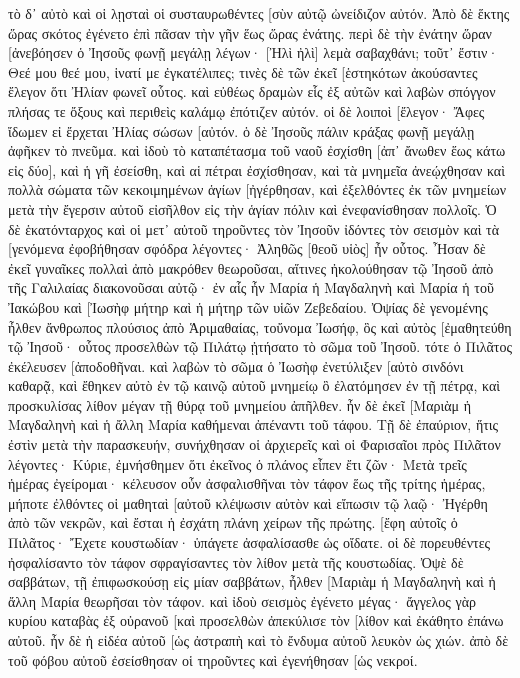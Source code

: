 τὸ δ᾽ αὐτὸ καὶ οἱ λῃσταὶ οἱ συσταυρωθέντες [σὺν αὐτῷ ὠνείδιζον αὐτόν. 
Ἀπὸ δὲ ἕκτης ὥρας σκότος ἐγένετο ἐπὶ πᾶσαν τὴν γῆν ἕως ὥρας ἐνάτης. 
περὶ δὲ τὴν ἐνάτην ὥραν [ἀνεβόησεν ὁ Ἰησοῦς φωνῇ μεγάλῃ λέγων· [Ἠλὶ ἠλὶ] λεμὰ σαβαχθάνι; τοῦτ᾽ ἔστιν· Θεέ μου θεέ μου, ἱνατί με ἐγκατέλιπες; 
τινὲς δὲ τῶν ἐκεῖ [ἑστηκότων ἀκούσαντες ἔλεγον ὅτι Ἠλίαν φωνεῖ οὗτος. 
καὶ εὐθέως δραμὼν εἷς ἐξ αὐτῶν καὶ λαβὼν σπόγγον πλήσας τε ὄξους καὶ περιθεὶς καλάμῳ ἐπότιζεν αὐτόν. 
οἱ δὲ λοιποὶ [ἔλεγον· Ἄφες ἴδωμεν εἰ ἔρχεται Ἠλίας σώσων [αὐτόν. 
ὁ δὲ Ἰησοῦς πάλιν κράξας φωνῇ μεγάλῃ ἀφῆκεν τὸ πνεῦμα. 
καὶ ἰδοὺ τὸ καταπέτασμα τοῦ ναοῦ ἐσχίσθη [ἀπ᾽ ἄνωθεν ἕως κάτω εἰς δύο], καὶ ἡ γῆ ἐσείσθη, καὶ αἱ πέτραι ἐσχίσθησαν, 
καὶ τὰ μνημεῖα ἀνεῴχθησαν καὶ πολλὰ σώματα τῶν κεκοιμημένων ἁγίων [ἠγέρθησαν, 
καὶ ἐξελθόντες ἐκ τῶν μνημείων μετὰ τὴν ἔγερσιν αὐτοῦ εἰσῆλθον εἰς τὴν ἁγίαν πόλιν καὶ ἐνεφανίσθησαν πολλοῖς. 
Ὁ δὲ ἑκατόνταρχος καὶ οἱ μετ᾽ αὐτοῦ τηροῦντες τὸν Ἰησοῦν ἰδόντες τὸν σεισμὸν καὶ τὰ [γενόμενα ἐφοβήθησαν σφόδρα λέγοντες· Ἀληθῶς [θεοῦ υἱὸς] ἦν οὗτος. 
Ἦσαν δὲ ἐκεῖ γυναῖκες πολλαὶ ἀπὸ μακρόθεν θεωροῦσαι, αἵτινες ἠκολούθησαν τῷ Ἰησοῦ ἀπὸ τῆς Γαλιλαίας διακονοῦσαι αὐτῷ· 
ἐν αἷς ἦν Μαρία ἡ Μαγδαληνὴ καὶ Μαρία ἡ τοῦ Ἰακώβου καὶ [Ἰωσὴφ μήτηρ καὶ ἡ μήτηρ τῶν υἱῶν Ζεβεδαίου. 
Ὀψίας δὲ γενομένης ἦλθεν ἄνθρωπος πλούσιος ἀπὸ Ἁριμαθαίας, τοὔνομα Ἰωσήφ, ὃς καὶ αὐτὸς [ἐμαθητεύθη τῷ Ἰησοῦ· 
οὗτος προσελθὼν τῷ Πιλάτῳ ᾐτήσατο τὸ σῶμα τοῦ Ἰησοῦ. τότε ὁ Πιλᾶτος ἐκέλευσεν [ἀποδοθῆναι. 
καὶ λαβὼν τὸ σῶμα ὁ Ἰωσὴφ ἐνετύλιξεν [αὐτὸ σινδόνι καθαρᾷ, 
καὶ ἔθηκεν αὐτὸ ἐν τῷ καινῷ αὐτοῦ μνημείῳ ὃ ἐλατόμησεν ἐν τῇ πέτρᾳ, καὶ προσκυλίσας λίθον μέγαν τῇ θύρᾳ τοῦ μνημείου ἀπῆλθεν. 
ἦν δὲ ἐκεῖ [Μαριὰμ ἡ Μαγδαληνὴ καὶ ἡ ἄλλη Μαρία καθήμεναι ἀπέναντι τοῦ τάφου. 
Τῇ δὲ ἐπαύριον, ἥτις ἐστὶν μετὰ τὴν παρασκευήν, συνήχθησαν οἱ ἀρχιερεῖς καὶ οἱ Φαρισαῖοι πρὸς Πιλᾶτον 
λέγοντες· Κύριε, ἐμνήσθημεν ὅτι ἐκεῖνος ὁ πλάνος εἶπεν ἔτι ζῶν· Μετὰ τρεῖς ἡμέρας ἐγείρομαι· 
κέλευσον οὖν ἀσφαλισθῆναι τὸν τάφον ἕως τῆς τρίτης ἡμέρας, μήποτε ἐλθόντες οἱ μαθηταὶ [αὐτοῦ κλέψωσιν αὐτὸν καὶ εἴπωσιν τῷ λαῷ· Ἠγέρθη ἀπὸ τῶν νεκρῶν, καὶ ἔσται ἡ ἐσχάτη πλάνη χείρων τῆς πρώτης. 
[ἔφη αὐτοῖς ὁ Πιλᾶτος· Ἔχετε κουστωδίαν· ὑπάγετε ἀσφαλίσασθε ὡς οἴδατε. 
οἱ δὲ πορευθέντες ἠσφαλίσαντο τὸν τάφον σφραγίσαντες τὸν λίθον μετὰ τῆς κουστωδίας. 
Ὀψὲ δὲ σαββάτων, τῇ ἐπιφωσκούσῃ εἰς μίαν σαββάτων, ἦλθεν [Μαριὰμ ἡ Μαγδαληνὴ καὶ ἡ ἄλλη Μαρία θεωρῆσαι τὸν τάφον. 
καὶ ἰδοὺ σεισμὸς ἐγένετο μέγας· ἄγγελος γὰρ κυρίου καταβὰς ἐξ οὐρανοῦ [καὶ προσελθὼν ἀπεκύλισε τὸν [λίθον καὶ ἐκάθητο ἐπάνω αὐτοῦ. 
ἦν δὲ ἡ εἰδέα αὐτοῦ [ὡς ἀστραπὴ καὶ τὸ ἔνδυμα αὐτοῦ λευκὸν ὡς χιών. 
ἀπὸ δὲ τοῦ φόβου αὐτοῦ ἐσείσθησαν οἱ τηροῦντες καὶ ἐγενήθησαν [ὡς νεκροί. 
